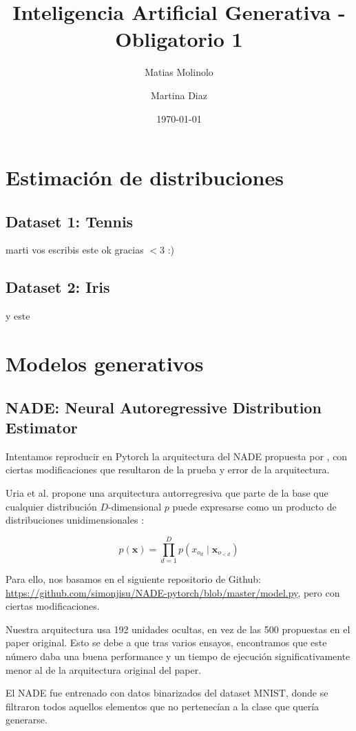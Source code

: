 \documentclass[11pt]{article}
\title{Inteligencia Artificial Generativa - Obligatorio 1}
\author{Matias Molinolo \and Martina Diaz}
\date{\today}
\begin{document}
\maketitle
\thispagestyle{empty}
\newpage
\tableofcontents
\newpage

\section{Estimación de distribuciones}

\subsection{Dataset 1: Tennis}
marti vos escribis este 
ok gracias $<$3
:)
\subsection{Dataset 2: Iris}
y este

\section{Modelos generativos}
\subsection{NADE: Neural Autoregressive Distribution Estimator}

Intentamos reproducir en Pytorch la arquitectura del NADE propuesta por \cite{nade}, con ciertas modificaciones que resultaron de la prueba y error de la arquitectura.

Uria et al. propone una arquitectura autorregresiva que parte de la base que cualquier distribución $D$-dimensional $p$ puede expresarse como un producto de distribuciones unidimensionales \cite{nade}:

$$
p(\boldsymbol{x}) = \prod_{d=1}^{D}p(x_{o_d} \mid \boldsymbol{x}_{o_{<d}})
$$

Para ello, nos basamos en el siguiente repositorio de Github: \url{https://github.com/simonjisu/NADE-pytorch/blob/master/model.py}, pero con ciertas modificaciones.

Nuestra arquitectura usa 192 unidades ocultas, en vez de las 500 propuestas en el paper original. Esto se debe a que tras varios ensayos, encontramos que este número daba una buena performance y un tiempo de ejecución significativamente menor al de la arquitectura original del paper. 

El NADE fue entrenado con datos binarizados del dataset MNIST, donde se filtraron todos aquellos elementos que no pertenecían a la clase que quería generarse.
\end{document}
